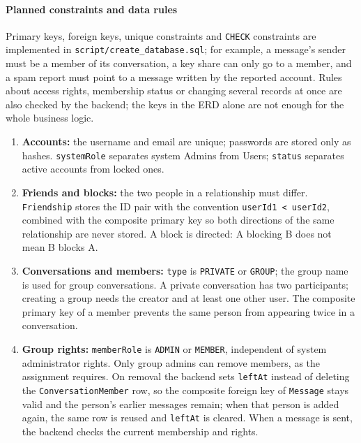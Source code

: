\paragraph{Planned constraints and data rules}
\mbox{}\par

Primary keys, foreign keys, unique constraints and \texttt{CHECK} constraints are
implemented in \texttt{script/create\_database.sql}; for example, a message's sender
must be a member of its conversation, a key share can only go to a member, and a
spam report must point to a message written by the reported account.
Rules about access rights, membership status or changing several records at once
are also checked by the backend; the keys in the ERD alone are not enough for
the whole business logic.

\begin{enumerate}
  \item \textbf{Accounts:} the username and email are unique;
    passwords are stored only as hashes. \texttt{systemRole} separates
    system Admins from Users; \texttt{status} separates active accounts
    from locked ones.
  \item \textbf{Friends and blocks:} the two people in a relationship must differ.
    \texttt{Friendship} stores the ID pair with the convention
    \texttt{userId1 < userId2}, combined with the composite primary key so both
    directions of the same relationship are never stored. A block is directed:
    A blocking B does not mean B blocks A.
  \item \textbf{Conversations and members:} \texttt{type} is
    \texttt{PRIVATE} or \texttt{GROUP}; the group name is used for group conversations.
    A private conversation has two participants; creating a group needs the creator
    and at least one other user. The composite primary key of a member prevents
    the same person from appearing twice in a conversation.
  \item \textbf{Group rights:} \texttt{memberRole} is
    \texttt{ADMIN} or \texttt{MEMBER}, independent of system administrator rights.
    Only group admins can remove members, as the assignment requires. On removal the
    backend sets \texttt{leftAt} instead of deleting the \texttt{ConversationMember}
    row, so the composite foreign key of \texttt{Message} stays valid and the person's
    earlier messages remain; when that person is added again, the same row is reused
    and \texttt{leftAt} is cleared.
    When a message is sent, the backend checks the current membership and rights.

\end{enumerate}
